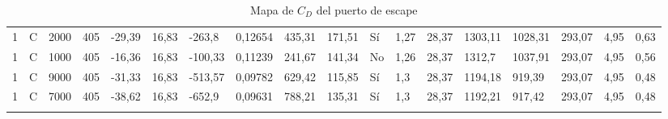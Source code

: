 {\begin{landscape}
\begin{longtable}{llllllllllllllllll}
    1 & C & 2000 & 405 & -29,39 & 16,83 & -263,8 & 0,12654 & 435,31 & 171,51 & Sí & 1,27 & 28,37 & 1303,11 & 1028,31 & 293,07 & 4,95 & 0,63 \\
    1 & C & 1000 & 405 & -16,36 & 16,83 & -100,33 & 0,11239 & 241,67 & 141,34 & No & 1,26 & 28,37 & 1312,7 & 1037,91 & 293,07 & 4,95 & 0,56 \\
    1 & C & 9000 & 405 & -31,33 & 16,83 & -513,57 & 0,09782 & 629,42 & 115,85 & Sí & 1,3 & 28,37 & 1194,18 & 919,39 & 293,07 & 4,95 & 0,48 \\
    1 & C & 7000 & 405 & -38,62 & 16,83 & -652,9 & 0,09631 & 788,21 & 135,31 & Sí & 1,3 & 28,37 & 1192,21 & 917,42 & 293,07 & 4,95 & 0,48 \\ \bottomrule
    \caption{Mapa de $C_D$ del puerto de escape} \label{tab:mapa_cd_escape}
    \end{longtable}
\end{landscape}
}
